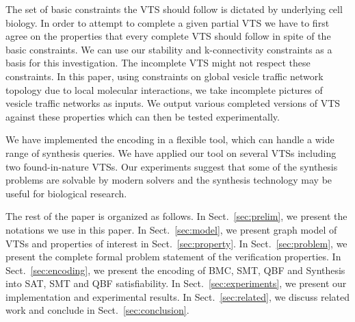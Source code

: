 %
The set of basic constraints the VTS should follow is dictated by underlying cell biology.   
%
In order to attempt to complete a given partial VTS we have to first agree on the properties that every complete VTS should follow in spite of the basic constraints. 
%
We can use our stability and k-connectivity constraints as a basis for this investigation.   
%
The incomplete VTS might not respect these constraints. 
%
In this paper, using constraints on global vesicle traffic network topology due to local molecular interactions, we take incomplete pictures of vesicle traffic networks as inputs.
%
We output various completed versions of VTS against these properties which can then be tested experimentally.
%

We have implemented the encoding in a flexible tool, which can handle a wide range of synthesis queries. 
%
We have applied our tool on several VTSs including
two found-in-nature VTSs.
%
Our experiments suggest that some of the synthesis problems are solvable by modern solvers and the synthesis technology may be useful for biological research.
%

The rest of the paper is organized as follows. 
%
In Sect.~\ref{sec:prelim}, we present the notations we use in this paper. 
%
In Sect.~\ref{sec:model}, we present graph model of VTSs and  properties of interest in Sect.~\ref{sec:property}.
%
%
%
In Sect.~\ref{sec:problem}, we present the complete formal problem statement of the verification properties.
%
In Sect.~\ref{sec:encoding}, we present the encoding of BMC, SMT, QBF and Synthesis into SAT, SMT and QBF satisfiability. 
%
In Sect.~\ref{sec:experiments}, we present our implementation and experimental results. 
%
In Sect.~\ref{sec:related}, we discuss related work and conclude in Sect.~\ref{sec:conclusion}.

%

